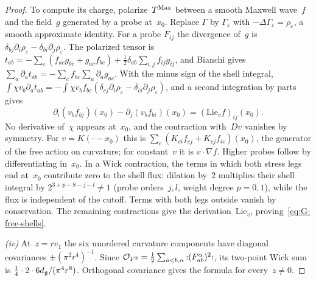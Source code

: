 \begin{proof}
To compute its charge, polarize~$T^{\mathrm{Max}}$ between a smooth Maxwell wave~$f$ and the field~$g$ generated by a probe at~$x_0$. Replace $\Gamma$ by $\Gamma_\varepsilon$ with $-\Delta\Gamma_\varepsilon=\rho_\varepsilon$, a smooth approximate identity. For a probe $F_{ij}$ the divergence of~$g$ is $\delta_{bj}\partial_i\rho_\varepsilon-\delta_{bi}\partial_j\rho_\varepsilon$. The polarized tensor is $t_{ab}=-\sum_c(f_{ac}g_{bc}+g_{ac}f_{bc})+\tfrac12\delta_{ab}\sum_{i,j}f_{ij}g_{ij}$, and Bianchi gives $\sum_a\partial_at_{ab}=-\sum_c f_{bc}\sum_a\partial_ag_{ac}$. With the minus sign of the shell integral, $\int\chi v_b\partial_at_{ab}=-\int\chi v_b f_{bc}(\delta_{cj}\partial_i\rho_\varepsilon-\delta_{ci}\partial_j\rho_\varepsilon)$, and a second integration by parts gives
\begin{equation*}
\partial_i(v_bf_{bj})(x_0)-\partial_j(v_bf_{bi})(x_0)
 =(\mathrm{Lie}_vf)_{ij}(x_0).
\end{equation*}
No derivative of~$\chi$ appears at~$x_0$, and the contraction with~$Dv$ vanishes by symmetry. For $v=K(\cdot-x_0)$ this is $\sum_c(K_{ci}f_{cj}+K_{cj}f_{ic})(x_0)$, the generator of the free action on curvature; for constant~$v$ it is $v\cdot\nabla f$. Higher probes follow by differentiating in~$x_0$. In a Wick contraction, the terms in which both stress legs end at~$x_0$ contribute zero to the shell flux: dilation by~$2$ multiplies their shell integral by $2^{3+p-8-j-l}\ne1$ (probe orders~$j,l$, weight degree $p=0,1$), while the flux is independent of the cutoff. Terms with both legs outside vanish by conservation. The remaining contractions give the derivation~$\mathrm{Lie}_v$, proving~\eqref{eq:G-free-shells}.

\emph{(iv)} At~$z=re_1$ the six unordered curvature components have diagonal covariances $\pm(\pi^2r^4)^{-1}$. Since $\mathcal{O}_{F^2}=\tfrac12\sum_{a<b,\alpha}{:}(F_{ab}^\alpha)^2{:}$, its two-point Wick sum is $\tfrac14\cdot2\cdot6d_{\mathfrak{g}}/(\pi^4r^8)$. Orthogonal covariance gives the formula for every~$z\ne0$.
\end{proof}

